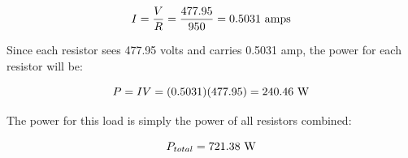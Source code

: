 $$I = {V \over R} = {477.95 \over 950} = 0.5031 \hbox{ amps}$$

Since each resistor sees 477.95 volts and carries 0.5031 amp, the power for each resistor will be:

$$P = IV = (0.5031)(477.95) = 240.46 \hbox{ W}$$

The power for this load is simply the power of all resistors combined:  

$$P_{total} = 721.38 \hbox{ W}$$












